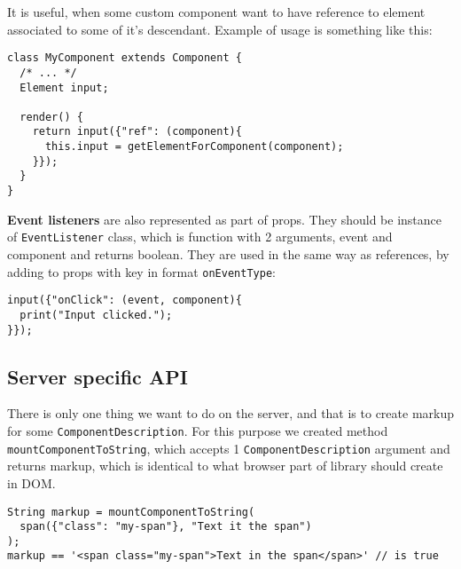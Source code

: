 \documentclass[oneside, 12pt]{book}
\begin{document}
    It is useful, when some custom component want to have reference to element associated to some of it's descendant. 
    Example of usage is something like this:
\begin{verbatim}
class MyComponent extends Component {
  /* ... */
  Element input;

  render() {
    return input({"ref": (component){
      this.input = getElementForComponent(component);
    }});
  }
}
\end{verbatim}



    \textbf{Event listeners} are also represented as part of props. 
    They should be instance of \texttt{EventListener} class, which is function with 2 arguments, event and component and returns boolean.
    They are used in the same way as references, by adding to props with key in format \texttt{onEventType}:

\begin{verbatim}
input({"onClick": (event, component){
  print("Input clicked.");
}});
\end{verbatim}



  \subsection{Server specific API}\label{subsec:our-api-server}

    There is only one thing we want to do on the server, and that is to create markup for some \texttt{ComponentDescription}.
    For this purpose we created method \texttt{mountComponentToString}, which accepts 1 \texttt{ComponentDescription} argument and returns markup, 
    which is identical to what browser part of library should create in DOM.
\begin{verbatim}
String markup = mountComponentToString(
  span({"class": "my-span"}, "Text it the span")
);
markup == '<span class="my-span">Text in the span</span>' // is true
\end{verbatim}

\end{document}
